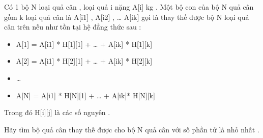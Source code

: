 Có 1 bộ N loại quả cân , loại quả i nặng A[i] kg . Một bộ con của bộ N quả cân gồm k loại quả cân là A[i1] , A[i2] , … A[ik] gọi là thay thế được bộ N loại quả cân trên nếu như tồn tại hệ đẳng thức sau :
\begin{itemize}
	\item A[1] = A[i1] * H[1][1] + … + A[ik] * H[1][k]
	\item A[2] = A[i1] * H[2][1] + … + A[ik] * H[2][k]
	\item …
	\item A[N] = A[i1] * H[N][1] + … + A[ik]* H[N][k]
\end{itemize}

Trong đó H[i][j] là các số nguyên .


Hãy tìm bộ quả cân thay thế được cho bộ N quả cân với số phần tử là nhỏ nhất .